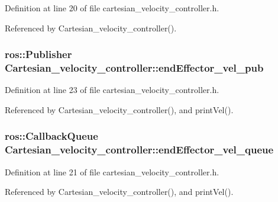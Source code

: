 Definition at line 20 of file cartesian\-\_\-velocity\-\_\-controller.\-h.



Referenced by Cartesian\-\_\-velocity\-\_\-controller().

\hypertarget{classCartesian__velocity__controller_ab12287816ae785d3cd6243b3df0cffc6}{
\subsubsection[{end\-Effector\-\_\-vel\-\_\-pub}]{\setlength{\rightskip}{0pt plus 5cm}ros\-::\-Publisher Cartesian\-\_\-velocity\-\_\-controller\-::end\-Effector\-\_\-vel\-\_\-pub\hspace{0.3cm}{\ttfamily [protected]}}}\label{classCartesian__velocity__controller_ab12287816ae785d3cd6243b3df0cffc6}


Definition at line 23 of file cartesian\-\_\-velocity\-\_\-controller.\-h.



Referenced by Cartesian\-\_\-velocity\-\_\-controller(), and print\-Vel().

\hypertarget{classCartesian__velocity__controller_af154b0cda931081b52224eb22e4680f7}{
\subsubsection[{end\-Effector\-\_\-vel\-\_\-queue}]{\setlength{\rightskip}{0pt plus 5cm}ros\-::\-Callback\-Queue Cartesian\-\_\-velocity\-\_\-controller\-::end\-Effector\-\_\-vel\-\_\-queue\hspace{0.3cm}{\ttfamily [protected]}}}\label{classCartesian__velocity__controller_af154b0cda931081b52224eb22e4680f7}


Definition at line 21 of file cartesian\-\_\-velocity\-\_\-controller.\-h.



Referenced by Cartesian\-\_\-velocity\-\_\-controller(), and print\-Vel().


